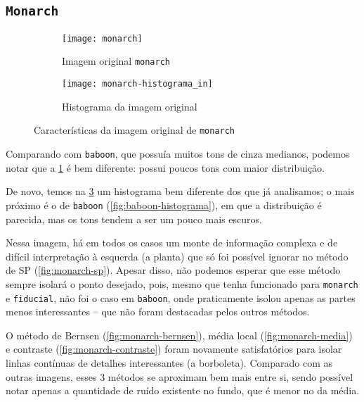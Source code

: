 \documentclass[brazilian,a4paper,twocolumn]{article}
\begin{document}
    \subsection{\texttt{Monarch}}
    \label{sec:monarch}

        \begin{figure}[h]
            \centering
            \begin{subfigure}{0.30\textwidth}
                \texttt{[image: monarch]}
                \caption{Imagem original \texttt{monarch}}
                \label{fig:monarch}
            \end{subfigure}
            \begin{subfigure}{0.5\textwidth}
                \texttt{[image: monarch-histograma\_in]}
                \caption{Histograma da imagem original}
                \label{fig:monarch-histograma}
            \end{subfigure}

            \caption{Características da imagem original de \texttt{monarch}}
        \end{figure}

        Comparando com \texttt{baboon}, que possuía muitos tons de cinza medianos, podemos notar que a \cref{fig:monarch} é bem diferente: possui poucos tons com maior distribuição.

        De novo, temos na \cref{fig:monarch-histograma} um histograma bem diferente dos que já analisamos; o mais próximo é o de \texttt{baboon} (\cref{fig:baboon-histograma}), em que a distribuição é parecida, mas os tons tendem a ser um pouco mais escuros.

        Nessa imagem, há em todos os casos um monte de informação complexa e de difícil interpretação à esquerda (a planta) que só foi possível ignorar no método de SP (\cref{fig:monarch-sp}). Apesar disso, não podemos esperar que esse método sempre isolará o ponto desejado, pois, mesmo que tenha funcionado para \texttt{monarch} e \texttt{fiducial}, não foi o caso em \texttt{baboon}, onde praticamente isolou apenas as partes menos interessantes -- que não foram destacadas pelos outros métodos.

        O método de Bernsen (\cref{fig:monarch-bernsen}), média local (\cref{fig:monarch-media}) e contraste (\cref{fig:monarch-contraste}) foram novamente satisfatórios para isolar linhas contínuas de detalhes interessantes (a borboleta). Comparado com as outras imagens, esses 3 métodos se aproximam bem mais entre si, sendo possível notar apenas a quantidade de ruído existente no fundo, que é menor no da média.
\end{document}
